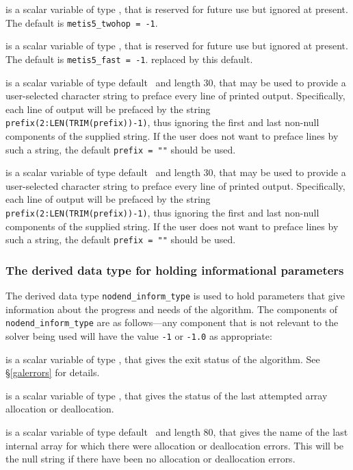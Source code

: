 \documentclass{galahad}
\newcommand{\packagename}{nodend}
\begin{document}
\begin{description}
 is a scalar variable of type \integer, 
that is reserved for future use but ignored at present.
The default is {\tt metis5\_twohop = -1}.

 is a scalar variable of type \integer, 
that is reserved for future use but ignored at present.
The default is {\tt metis5\_fast = -1}.
replaced by this default.

 is a scalar variable of type default \character\
and length 30, that may be used to provide a user-selected
character string to preface every line of printed output.
Specifically, each line of output will be prefaced by the string
{\tt prefix(2:LEN(TRIM(prefix))-1)},
thus ignoring the first and last non-null components of the
supplied string. If the user does not want to preface lines by such
a string, the default {\tt prefix = ""} should be used.

 is a scalar variable of type default \character\
and length 30, that may be used to provide a user-selected
character string to preface every line of printed output.
Specifically, each line of output will be prefaced by the string
{\tt prefix(2:LEN(TRIM(prefix))-1)},
thus ignoring the first and last non-null components of the
supplied string. If the user does not want to preface lines by such
a string, the default {\tt prefix = ""} should be used.

\end{description}


\subsubsection{The derived data type for holding informational
 parameters}\label{typeinform}
The derived data type
{\tt \packagename\_inform\_type}
is used to hold parameters that give information about the progress and needs
of the algorithm. The components of
{\tt \packagename\_inform\_type}
are as follows---any component that is not relevant to the solver being used
will have the value {\tt -1} or {\tt -1.0} as appropriate:

\begin{description}

 is a scalar variable of type \integer, that gives the
exit status of the algorithm.
See \S\ref{galerrors}
for details.

 is a scalar variable of type \integer, that gives
the status of the last attempted array allocation or deallocation.

\itt{bad\_alloc} is a scalar variable of type default \character\
and length 80, that  gives the name of the last internal array
for which there were allocation or deallocation errors.
This will be the null string if there have been no
allocation or deallocation errors.

\end{description}
\end{document}
